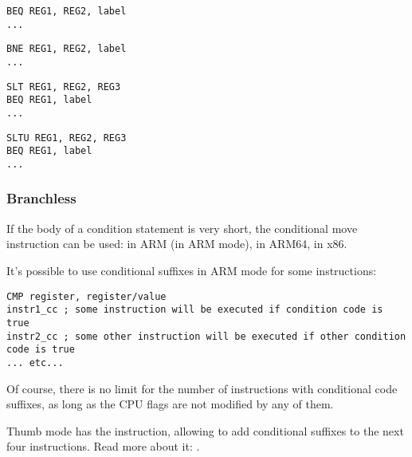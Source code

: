 \begin{lstlisting}[caption=Check for equal values,style=customasmMIPS]
BEQ REG1, REG2, label
...
\end{lstlisting}

\begin{lstlisting}[caption=Check for non-equal values,style=customasmMIPS]
BNE REG1, REG2, label
...
\end{lstlisting}

\begin{lstlisting}[caption=Check for less than (signed),style=customasmMIPS]
SLT REG1, REG2, REG3
BEQ REG1, label
...
\end{lstlisting}

\begin{lstlisting}[caption=Check for less than (unsigned),style=customasmMIPS]
SLTU REG1, REG2, REG3
BEQ REG1, label
...
\end{lstlisting}

\subsubsection{Branchless}

If the body of a condition statement is very short, the conditional move instruction can be used: 
 in ARM (in ARM mode),  in ARM64,  in x86.


It's possible to use conditional suffixes in ARM mode for some instructions:

\begin{lstlisting}[caption=ARM (\ARMMode),style=customasmARM]
CMP register, register/value
instr1_cc ; some instruction will be executed if condition code is true
instr2_cc ; some other instruction will be executed if other condition code is true
... etc...
\end{lstlisting}

Of course, there is no limit for the number of instructions with conditional code suffixes, 
as long as the CPU flags are not modified by any of them.


Thumb mode has the  instruction, allowing to add conditional suffixes to the next four instructions.
Read more about it: .

